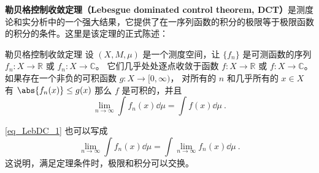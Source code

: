 
\begin{issues}
\issueDraft
\end{issues}


\textbf{勒贝格控制收敛定理（Lebesgue dominated control theorem, DCT）}是测度论和实分析中的一个强大结果，它提供了在一序列函数的积分的极限等于极限函数的积分的条件。这里是该定理的正式陈述：

\begin{theorem}{勒贝格控制收敛定理}
设 $(X,M,\mu)$ 是一个测度空间，让 $\{f_n\}$ 是可测函数的序列 $f_n: X\to\mathbb R$ 或 $f_n:X\to\mathbb C$。 它们几乎处处逐点收敛于函数 $f: X\to\mathbb R$ 或 $f:X\to\mathbb C$。 如果存在一个非负的可积函数 $g:X\to[0,\infty)$， 对所有的 $n$ 和几乎所有的 $x\in X$ 有 $\abs{f_n(x)}\leq g(x)$ 那么 $f$ 是可积的，并且
\begin{equation}\label{eq_LebDC_1}
\lim_{n\to\infty}\int f_n(x)\dd{\mu} = \int f(x)\dd{\mu}~.
\end{equation}
\end{theorem}

\autoref{eq_LebDC_1} 也可以写成
\begin{equation}
\lim_{n\to\infty}\int f_n(x)\dd{\mu} = \int\lim_{n\to\infty} f_n(x)\dd{\mu}~.
\end{equation}
这说明，满足定理条件时，极限和积分可以交换。
